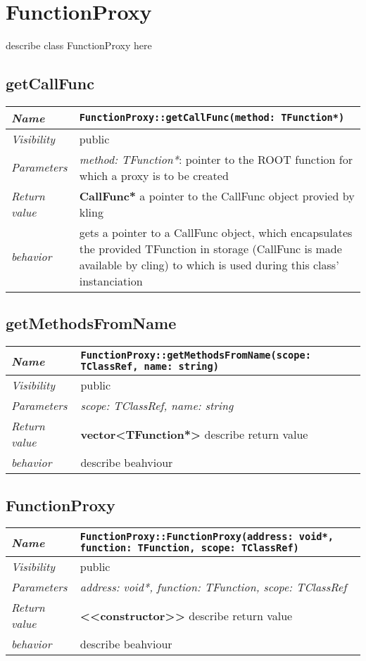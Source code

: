 \chapter{FunctionProxy}
describe class FunctionProxy here
\section{getCallFunc}
\begin{longtable}{p{3cm} @{\hskip 1cm} p{12cm}}
 \hline
\textit{Name} & \texttt{FunctionProxy::getCallFunc(method: TFunction*)}\\
\hline
 \textit{Visibility} & public\\
\hline
\textit{Parameters} &  \textit{method: TFunction*}: pointer to the ROOT function for which a proxy 
						is to be created\\
\hline
\textit{Return value} & \textbf{ CallFunc*} a pointer to the CallFunc object provied by kling\\
  \hline
 \textit{behavior} & gets a pointer to a CallFunc object, which encapsulates the provided TFunction 
		in storage (CallFunc is made available by cling)  to which is used during this class' instanciation\\
\hline
\end{longtable} \pagebreak
 \section{getMethodsFromName}
\begin{longtable}{p{3cm} @{\hskip 1cm} p{12cm}}
 \hline
\textit{Name} & \texttt{FunctionProxy::getMethodsFromName(scope: TClassRef, name: string)}\\
\hline
 \textit{Visibility} & public\\
\hline
\textit{Parameters} & \textit{scope: TClassRef, name: string}\\
\hline
\textit{Return value} & \textbf{ vector<TFunction*>} describe return value\\
  \hline
 \textit{behavior} & describe beahviour \\
\hline
\end{longtable} \pagebreak
 \section{FunctionProxy}
\begin{longtable}{p{3cm} @{\hskip 1cm} p{12cm}}
 \hline
\textit{Name} & \texttt{FunctionProxy::FunctionProxy(address: void*, function: TFunction, scope: TClassRef)}\\
\hline
 \textit{Visibility} & public\\
\hline
\textit{Parameters} & \textit{address: void*, function: TFunction, scope: TClassRef}\\
\hline
\textit{Return value} & \textbf{ <<constructor>>} describe return value\\
  \hline
 \textit{behavior} & describe beahviour \\
\hline
\end{longtable} \pagebreak
